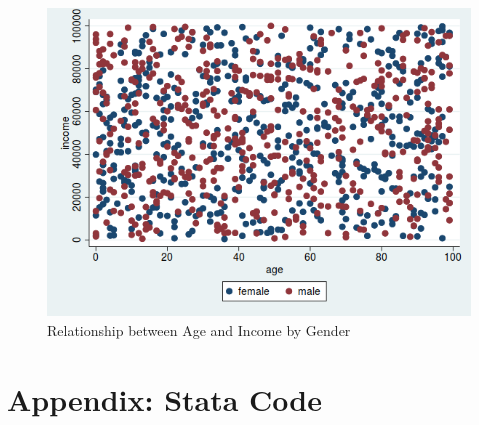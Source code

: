 \documentclass[11pt, oneside]{article}   	%
\begin{document}
\begin{figure}[htp]
    \centering
    \includegraphics[scale=0.5]{test.png}
    \caption{Relationship between Age and Income by Gender}
    \label{fig:scatter}
\end{figure}



\newpage

\appendix

\section*{Appendix: Stata Code}

\end{document}
